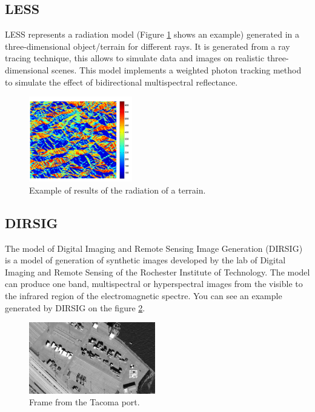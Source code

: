 \documentclass[10pt,a4paper,twocolumn,twoside]{article}
\begin{document}
\subsection{LESS}

LESS represents a radiation model (Figure \ref{fig-lessradiacio} shows an example) generated in a three-dimensional object/terrain for different rays. It is generated from a ray tracing technique, this allows to simulate data and images on realistic three-dimensional scenes. This model implements a weighted photon tracking method to simulate the effect of bidirectional multispectral reflectance.

\begin{figure}[h]
\centering
  	\includegraphics[width=0.4\textwidth]{lessradiacio}
	\caption{Example of results of the radiation of a terrain.}
	\label{fig-lessradiacio}
\end{figure}

\subsection{DIRSIG}
The model of Digital Imaging and Remote Sensing Image Generation (DIRSIG) is a model of generation of synthetic images developed by the lab of Digital Imaging and Remote Sensing of the Rochester Institute of Technology. The model can produce one band, multispectral or hyperspectral images from the visible to the infrared region of the electromagnetic spectre. You can see an example generated by DIRSIG on the figure \ref{fig-tacoma}.

\begin{figure}[h]
\centering
  	\includegraphics[width=0.49\textwidth]{tacoma}
	\caption{Frame from the Tacoma port.}
	\label{fig-tacoma}
\end{figure}
\end{document}
